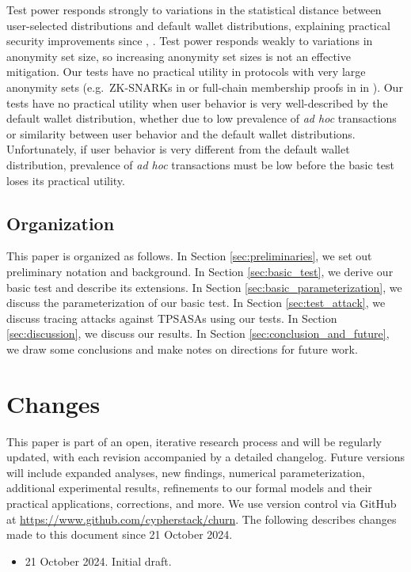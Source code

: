 \documentclass{tran-l}
\theoremstyle{cor}
\theoremstyle{definition}
\theoremstyle{remark}
\theoremstyle{conjecture}
\numberwithin{equation}{section}
\begin{document}
Test power responds strongly to variations in the statistical distance between user-selected distributions and default wallet distributions, explaining practical security improvements since \cite{moser2017empirical}, \cite{miller2017empirical}.
Test power responds weakly to variations in anonymity set size, so increasing anonymity set sizes is not an effective mitigation.
Our tests have no practical utility in protocols with very large anonymity sets (e.g.\ ZK-SNARKs in \cite{hopwood2016zcash} or full-chain membership proofs in in \cite{eagen2022zero}).
Our tests have no practical utility when user behavior is very well-described by the default wallet distribution, whether due to low prevalence of \textit{ad hoc} transactions or similarity between user behavior and the default wallet distributions.
Unfortunately, if user behavior is very different from the default wallet distribution, prevalence of \textit{ad hoc} transactions must be low before the basic test loses its practical utility.

\subsection{Organization}

This paper is organized as follows. In Section \ref{sec:preliminaries}, we set out preliminary notation and background. In Section \ref{sec:basic_test}, we derive our basic test and describe its extensions. In Section \ref{sec:basic_parameterization}, we discuss the parameterization of our basic test. In Section \ref{sec:test_attack}, we discuss tracing attacks against TPSASAs using our tests. In Section \ref{sec:discussion}, we discuss our results. In Section \ref{sec:conclusion_and_future}, we draw some conclusions and make notes on directions for future work.


\section*{Changes}



This paper is part of an open, iterative research process and will be regularly updated, with each revision accompanied by a detailed changelog.
Future versions will include expanded analyses, new findings, numerical parameterization, additional experimental results, refinements to our formal models and their practical applications, corrections, and more.
We use version control via GitHub at \url{https://www.github.com/cypherstack/churn}.
The following describes changes made to this document since 21 October 2024.
\begin{itemize}
\item 21 October 2024. Initial draft.
\end{itemize}
\end{document}
